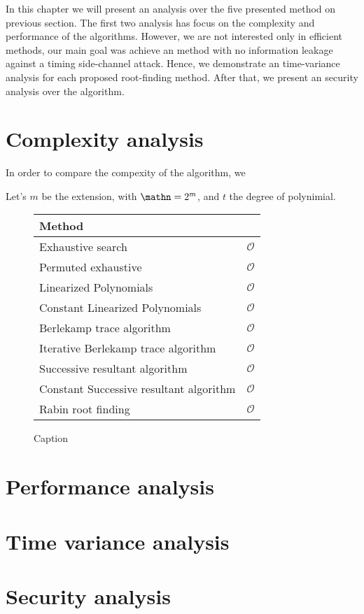 In this chapter we will present an analysis over the five presented method on previous section. The first two analysis has focus on the complexity and performance of the algorithms. However, we are not interested only in efficient methods, our main goal was achieve an method with no information leakage against a timing side-channel attack. Hence, we demonstrate an time-variance analysis for each proposed root-finding method. After that, we present an security analysis over the algorithm.

\section{Complexity analysis}
In order to compare the compexity of the algorithm, we 

Let's $m$ be the extension, with $\mathn = 2^m$, and $t$ the degree of polynimial.

\begin{figure}[ht]
    \centering
    \begin{table}[H]
    \begin{tabular}{ll}
    Method                                 &                \\ \hline
    Exhaustive search                      & $\mathcal{O}$ \\
    Permuted exhaustive                    & $\mathcal{O}$ \\
    Linearized Polynomials                 & $\mathcal{O}$ \\
    Constant Linearized Polynomials        & $\mathcal{O}$ \\
    Berlekamp trace algorithm              & $\mathcal{O}$ \\
    Iterative Berlekamp trace algorithm    & $\mathcal{O}$ \\
    Successive resultant algorithm          & $\mathcal{O}$ \\
    Constant Successive resultant algorithm & $\mathcal{O}$ \\
    Rabin root finding                     & $\mathcal{O}$
    \end{tabular}
    \end{table}
    \caption{Caption}
    \label{fig:my_label}
\end{figure}



\section{Performance analysis}
\section{Time variance analysis}
\section{Security analysis}